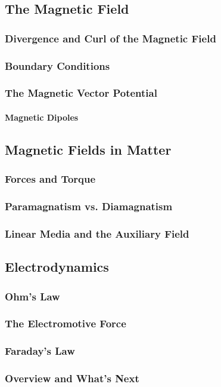 \documentclass[a4paper]{article}
\begin{document}
    \subsection{The Magnetic Field}
    \subsubsection{Divergence and Curl of the Magnetic Field}
    \subsubsection{Boundary Conditions}
    \subsubsection{The Magnetic Vector Potential}
    \paragraph{Magnetic Dipoles}
    \subsection{Magnetic Fields in Matter}
    \subsubsection{Forces and Torque}
    \subsubsection{Paramagnatism vs. Diamagnatism}
    \subsubsection{Linear Media and the Auxiliary Field}
    \subsection{Electrodynamics}
    \subsubsection{Ohm's Law}
    \subsubsection{The Electromotive Force}
    \subsubsection{Faraday's Law}
    \subsubsection{Overview and What's Next}
\end{document}
